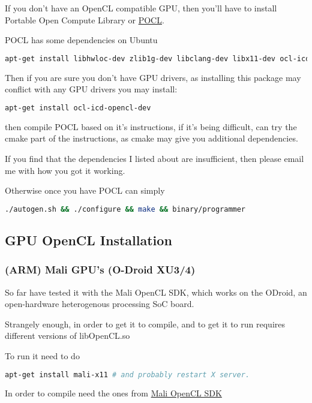 \documentclass[12pt]{article}
\begin{document}
If you don't have an OpenCL compatible GPU, then you'll have to install 
Portable Open Compute Library or
\href{http://pocl.sourceforge.net/}{POCL}.

POCL has some dependencies on Ubuntu
\begin{lstlisting}[language=bash]
apt-get install libhwloc-dev zlib1g-dev libclang-dev libx11-dev ocl-icd-dev cmake
\end{lstlisting}

Then if you are sure you don't have GPU drivers, as installing this package may
conflict with any GPU drivers you may install:
\begin{lstlisting}[language=bash]
apt-get install ocl-icd-opencl-dev
\end{lstlisting}

then compile POCL based on it's instructions, if it's being difficult, can try
the cmake part of the instructions, as cmake may give you additional
dependencies. 

If you find that the dependencies I listed about are insufficient, then please
email me with how you got it working.

Otherwise once you have POCL can simply 
\begin{lstlisting}[language=bash]
./autogen.sh && ./configure && make && binary/programmer
\end{lstlisting}

\subsection{GPU  OpenCL Installation}

\subsubsection{(ARM) Mali GPU's (O-Droid XU3/4)}

So far have tested it with the Mali OpenCL SDK, which works on the ODroid, an
open-hardware heterogenous processing SoC board.

Strangely enough, in order to get it to compile, and to get it to run requires
different versions of libOpenCL.so

To run it need to do
\begin{lstlisting}[language=bash]
apt-get install mali-x11 # and probably restart X server.
\end{lstlisting}

In order to compile need the ones from
\href{https://developer.arm.com/products/software/mali-sdks/mali-opencl-sdk/downloads}
{Mali OpenCL SDK}
\end{document}
